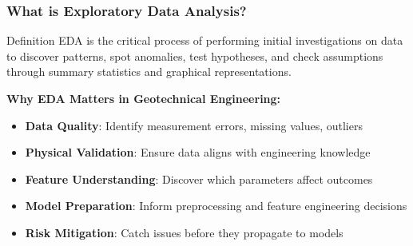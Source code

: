 \documentclass[aspectratio=169]{beamer}
\begin{document}
\begin{frame}
\frametitle{What is Exploratory Data Analysis?}

\begin{block}{Definition}
EDA is the critical process of performing initial investigations on data to discover patterns, spot anomalies, test hypotheses, and check assumptions through summary statistics and graphical representations.
\end{block}

\vspace{0.5cm}

\textbf{Why EDA Matters in Geotechnical Engineering:}
\begin{itemize}
    \item \textbf{Data Quality}: Identify measurement errors, missing values, outliers
    \item \textbf{Physical Validation}: Ensure data aligns with engineering knowledge
    \item \textbf{Feature Understanding}: Discover which parameters affect outcomes
    \item \textbf{Model Preparation}: Inform preprocessing and feature engineering decisions
    \item \textbf{Risk Mitigation}: Catch issues before they propagate to models
\end{itemize}

\end{frame}
\end{document}

